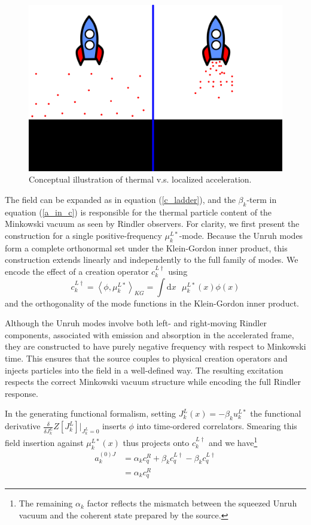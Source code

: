 \documentclass[12pt,a4paper]{article}
\newcommand{\dv}[1]{\mathrm{d} #1 \text{ }}
\begin{document}
\begin{figure}[h]
\centering
\includegraphics[scale=0.5]{rocket_inertial.png}
\caption{Conceptual illustration of thermal v.s. localized acceleration.}
\label{rocket_inertial}
\end{figure}

The field can be expanded as in equation (\ref{c_ladder}), and the $\beta_k$-term in equation (\ref{a_in_c}) is responsible for the thermal particle content of the Minkowski vacuum as seen by Rindler observers. For clarity, we first present the construction for a single positive-frequency $\mu^{L*}_k$-mode. Because the Unruh modes form a complete orthonormal set under the Klein-Gordon inner product, this construction extends linearly and independently to the full family of modes. We encode the effect of a creation operator $c_k^{L \dagger}$ using
\begin{equation}
  c _k^{L\dagger} = \left<\phi, \mu_k^{L*}\right>_{KG} = \int \dv{x} \mu_k^{L*}(x) \phi(x)
\end{equation}
and the orthogonality of the mode functions in the Klein-Gordon inner product.

Although the Unruh modes involve both left- and right-moving Rindler components, associated with emission and absorption in the accelerated frame, they are constructed to have purely negative frequency with respect to Minkowski time. This ensures that the source couples to physical creation operators and injects particles into the field in a well-defined way. The resulting excitation respects the correct Minkowski vacuum structure while encoding the full Rindler response.

In the generating functional formalism, setting $J_k^L(x) = -\beta_k u_k^{L*}$ the functional derivative $\frac{\delta}{\delta J_k^L}Z[J_k^L]|_{J_k^L=0}$ inserts $\phi$ into time-ordered correlators. Smearing this field insertion against $\mu_k^{L*}(x)$ thus projects onto $c_k^{L\dagger}$ and we have\footnote{The remaining $\alpha_k$ factor reflects the mismatch between the squeezed Unruh vacuum and the coherent state prepared by the source.}
\begin{equation}
\begin{array}{ll}
  a_k^{(0)J} &= \alpha_k c_q^R + \beta_k c_q^{L\dagger} -  \beta_k c_q^{L\dagger} \\
  &= \alpha_k c_q^R
\end{array}
\end{equation}
\end{document}
